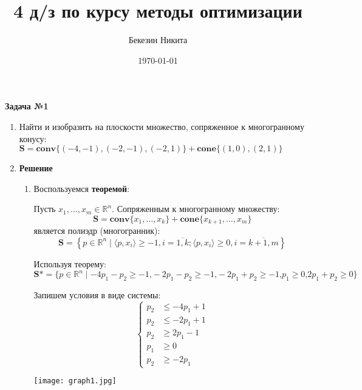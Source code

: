 \documentclass[a4paper,12pt]{article} %
\author{Бекезин Никита}
\title{4 д/з по курсу методы оптимизации}
\date{\today}
\begin{document}

\maketitle


\begin{center}
	\textbf{Задача №1}
\end{center}

\begin{enumerate}
	\item[] Найти и изобразить на плоскости множество, сопряженное к многогранному конусу:
	$ \textbf{S} = \mathbf{conv}\{(-4, -1), (-2, -1), (-2, 1)\} + \mathbf{cone}\{(1, 0), (2, 1) \}$
	\item[] \textbf{Решение}
		\begin{enumerate}
			\item[] Воспользуемся \textbf{теоремой}:
			
			Пусть $x_1,\ldots,x_m \in\mathbb{R}^n$. Сопряженным к многогранному множеству:\\ $$ \textbf{S} = \mathbf{conv}\{x_1, \ldots, x_k\} + \mathbf{cone}\{x_{k+1}, \ldots, x_m \}$$
			является полиэдр (многогранник):
			\[\textbf{S} = \left\{p \in \mathbb{R}^n \mid \langle{ p, x_i }\rangle \ge -1, i = \overline{1, k}; \langle{ p, x_i }\rangle \ge 0 , i =\overline{k+1, m} \right\} \]
			
			Используя теорему:
			\[\textbf{S*} = \{p \in \mathbb{R}^n \mid -4p_1 - p_2 \ge -1\textbf{,} - 2p_1 -p_2 \ge -1\textbf{,} -2p_1 + p_2 \ge -1 \textbf{,} p_1 \ge 0 \textbf{,} 2p_1 + p_2 \ge 0\}\]
			
			Запишем условия в виде системы:
			\[
			\left\{
			\begin{aligned}
			p_2 &\leq -4p_1 + 1  \\
			p_2 &\leq -2p_1 + 1\\
			p_2 &\ge 2p_1 - 1\\
			p_1 &\ge 0  \\
			p_2 &\ge -2p_1
			\end{aligned}
			\right.
			\]
			
		\texttt{[image: graph1.jpg]}
			
		\end{enumerate}
\end{enumerate}
\end{document}
